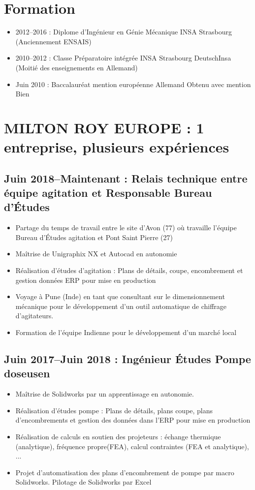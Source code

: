 \documentclass[10pt,a4paper,sans]{article}
\begin{document}
\begin{minipage}{0.75\textwidth}
    \section{Formation}
    \begin{itemize}
        \item{2012--2016 : Diplome d'Ingénieur en Génie Mécanique INSA Strasbourg (Anciennement ENSAIS)}
        \item{2010--2012 : Classe Préparatoire intégrée INSA Strasbourg DeutschInsa (Moitié des enseignements en Allemand)}
        \item{Juin 2010 : Baccalauréat mention européenne Allemand Obtenu avec mention Bien}
    \end{itemize}

    \section{MILTON ROY EUROPE : 1 entreprise, plusieurs expériences}
    \subsection{Juin 2018--Maintenant : Relais technique entre équipe agitation et Responsable Bureau d'Études}
    \begin{itemize}%
        \item Partage du temps de travail entre le site d’Avon (77) où travaille l’équipe Bureau d’Études agitation et Pont Saint Pierre (27)
        \item Maîtrise de Unigraphix NX et Autocad en autonomie
        \item Réalisation d’études d’agitation : Plans de détails, coupe, encombrement et gestion données ERP pour mise en production
        \item Voyage à Pune (Inde) en tant que consultant sur le dimensionnement mécanique pour le développement d’un outil automatique de chiffrage d’agitateurs.
        \item Formation de l’équipe Indienne pour le développement d’un marché local
    \end{itemize}

    \subsection{Juin 2017--Juin 2018 : Ingénieur Études Pompe doseusen}
    \begin{itemize}
        \item Maîtrise de Solidworks par un apprentissage en autonomie.
        \item Réalisation d’études pompe : Plans de détails, plans coupe, plans d’encombrements et gestion des données dans l’ERP pour mise en production
        \item Réalisation de calculs en soutien des projeteurs : échange thermique (analytique), fréquence propre(FEA), calcul contraintes (FEA et analytique), ...
        \item Projet d’automatisation des plans d’encombrement de pompe par macro Solidworks. Pilotage de Solidworks par Excel
    \end{itemize}


\end{minipage}
\end{document}
